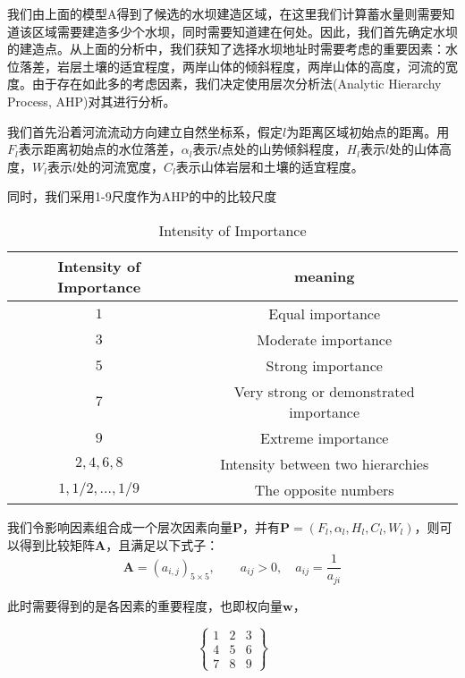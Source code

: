 \documentclass[nocover]{cumcmart}
\begin{document}
我们由上面的模型A得到了候选的水坝建造区域，在这里我们计算蓄水量则需要知道该区域需要建造多少个水坝，同时需要知道建在何处。因此，我们首先确定水坝的建造点。从上面的分析中，我们获知了选择水坝地址时需要考虑的重要因素：水位落差，岩层土壤的适宜程度，两岸山体的倾斜程度，两岸山体的高度，河流的宽度。由于存在如此多的考虑因素，我们决定使用层次分析法(Analytic Hierarchy Process, AHP)对其进行分析。

我们首先沿着河流流动方向建立自然坐标系，假定$l$为距离区域初始点的距离。用$F_{l}$表示距离初始点的水位落差，$\alpha_{l}$表示$l$点处的山势倾斜程度，$H_{l}$表示$l$处的山体高度，$W_{l}$表示$l$处的河流宽度，$C_{l}$表示山体岩层和土壤的适宜程度。

同时，我们采用1-9尺度作为AHP的中的比较尺度
\begin{table}[!ht]
\centering
  \begin{tabular}{cc}
  \hline
   Intensity of Importance & meaning  \\
  \hline
  $1$ & Equal importance \\  
  $3$ & Moderate importance \\
  $5$ & Strong importance \\
  $7$ & Very strong or demonstrated importance \\
  $9$ & Extreme importance \\
  $2,4,6,8$ & Intensity between two hierarchies \\
  $1,1/2,...,1/9$ & The opposite numbers\\
  \hline
  \end{tabular}
  \caption{Intensity of Importance}
\end{table}

我们令影响因素组合成一个层次因素向量$\textbf{P}$，并有$\textbf{P} = (F_{l}, \alpha_{l}, H_{l}, C_{l}, W_{l})$，则可以得到比较矩阵$\textbf{A}$，且满足以下式子：
\begin{equation}
\textbf{A} = (a_{i,j})_{5\times5},\qquad a_{ij} > 0, \quad a_{ij} = \frac{1}{a_{ji}}
\end{equation}

此时需要得到的是各因素的重要程度，也即权向量$\textbf{w}$，

$$
 \left\{
 \begin{matrix}
   1 & 2 & 3 \\
   4 & 5 & 6 \\
   7 & 8 & 9
  \end{matrix}
  \right\}
$$
\end{document}
